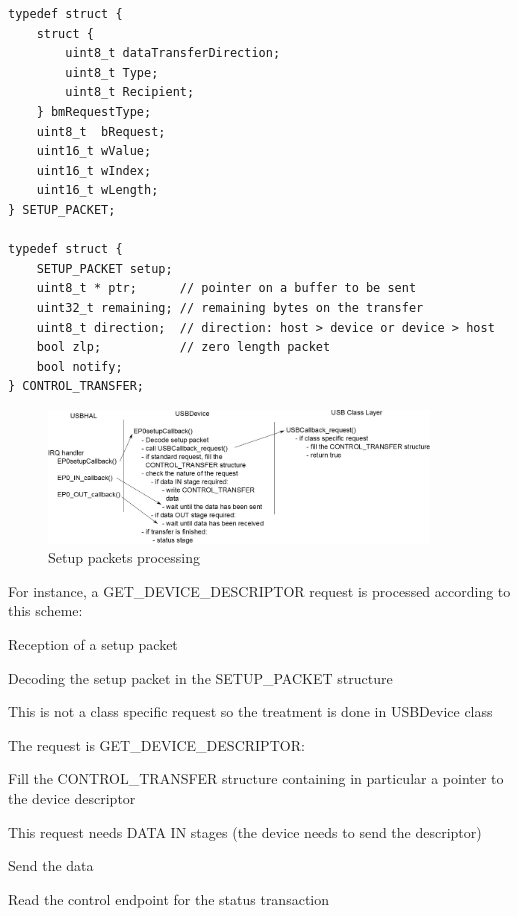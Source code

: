 \documentclass[pdftex,10pt,a4paper]{report}
\newenvironment{packed_item}{
\begin{itemize}
  \setlength{\itemsep}{1pt}
  \setlength{\parskip}{0pt}
  \setlength{\parsep}{0pt}
}{\end{itemize}}
\begin{document}
\begin{lstlisting}[label=Data structures for control endpoint processing,caption=Data structures for control endpoint processing]
typedef struct {
    struct {
        uint8_t dataTransferDirection;
        uint8_t Type;
        uint8_t Recipient;
    } bmRequestType;
    uint8_t  bRequest;
    uint16_t wValue;
    uint16_t wIndex;
    uint16_t wLength;
} SETUP_PACKET;

typedef struct {
    SETUP_PACKET setup;
    uint8_t * ptr;      // pointer on a buffer to be sent
    uint32_t remaining; // remaining bytes on the transfer
    uint8_t direction;  // direction: host > device or device > host
    bool zlp;           // zero length packet
    bool notify;
} CONTROL_TRANSFER;
\end{lstlisting}

\begin{figure}[h!]
		\centering
		\includegraphics[width=0.9\textwidth]{./setup_packets.jpg}
		\caption{Setup packets processing}
		\label{Setup packets processing}
\end{figure}

For instance, a GET\_DEVICE\_DESCRIPTOR request is processed according to this scheme:
\begin{packed_item}
	\item Reception of a setup packet
	\item Decoding the setup packet in the SETUP\_PACKET structure
	\item This is not a class specific request so the treatment is done in USBDevice class
	\item The request is GET\_DEVICE\_DESCRIPTOR:
	\begin{packed_item}
		\item Fill the CONTROL\_TRANSFER structure containing in particular a pointer to the device descriptor
		\item This request needs DATA IN stages (the device needs to send the descriptor)
		\item Send the data
		\item Read the control endpoint for the status transaction
	\end{packed_item}
\end{packed_item}
\end{document}
